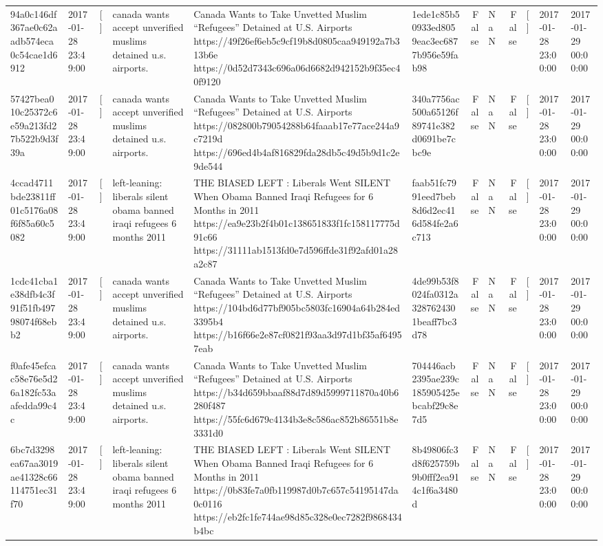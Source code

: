\begin{tabular}{llllllrlrlll}
94a0c146df367ae0c62aadb574eca0c54cae1d6912 & 2017-01-28 23:49:00 & [] & canada wants accept unverified muslims detained u.s. airports. & Canada Wants to Take Unvetted Muslim “Refugees” Detained at U.S. Airports https://49f26ef6eb5c9cf19b8d0805caa949192a7b313b6e https://0d52d7343c696a06d6682d942152b9f35ec40f9120 & 1ede1c85b50933ed8059eac3ec6877b956e59fab98 & False & NaN & False & [] & 2017-01-28 23:00:00 & 2017-01-29 00:00:00 \\
57427bea010c25372c6e59a213fd27b522b9d3f39a & 2017-01-28 23:49:00 & [] & canada wants accept unverified muslims detained u.s. airports. & Canada Wants to Take Unvetted Muslim “Refugees” Detained at U.S. Airports https://082800b79054288b64faaab17e77ace244a9c7219d https://696ed4b4af816829fda28db5c49d5b9d1c2e9de544 & 340a7756ac500a65126f89741e382d0691be7cbc9e & False & NaN & False & [] & 2017-01-28 23:00:00 & 2017-01-29 00:00:00 \\
4ccad4711bde23811ff01c5176a08f6f85a60c5082 & 2017-01-28 23:49:00 & [] & left-leaning: liberals silent obama banned iraqi refugees 6 months 2011 & THE BIASED LEFT : Liberals Went SILENT When Obama Banned Iraqi Refugees for 6 Months in 2011 https://ea9e23b2f4b01c138651833f1fc158117775d91c66 https://31111ab1513fd0e7d596ffde31f92afd01a28a2c87 & faab51fc7991eed7beb8d6d2ec416d584fe2a6c713 & False & NaN & False & [] & 2017-01-28 23:00:00 & 2017-01-29 00:00:00 \\
1cdc41cba1e38dfb4c3f91f51fb49798074f68ebb2 & 2017-01-28 23:49:00 & [] & canada wants accept unverified muslims detained u.s. airports. & Canada Wants to Take Unvetted Muslim “Refugees” Detained at U.S. Airports https://104bd6d77bf905bc5803fc16904a64b284ed3395b4 https://b16f66e2e87cf0821f93aa3d97d1bf35af64957eab & 4de99b53f8024fa0312a3287624301beaff7bc3d78 & False & NaN & False & [] & 2017-01-28 23:00:00 & 2017-01-29 00:00:00 \\
f0afe45efcac58e76e5d26a182fc53aafedda99c4c & 2017-01-28 23:49:00 & [] & canada wants accept unverified muslims detained u.s. airports. & Canada Wants to Take Unvetted Muslim “Refugees” Detained at U.S. Airports https://b34d659bbaaf88d7d89d5999711870a40b6280f487 https://55fc6d679c4134b3e8c586ac852b86551b8e3331d0 & 704446acb2395ae239c185905425ebcabf29c8e7d5 & False & NaN & False & [] & 2017-01-28 23:00:00 & 2017-01-29 00:00:00 \\
6bc7d3298ea67aa3019ae41328c66114751ec31f70 & 2017-01-28 23:49:00 & [] & left-leaning: liberals silent obama banned iraqi refugees 6 months 2011 & THE BIASED LEFT : Liberals Went SILENT When Obama Banned Iraqi Refugees for 6 Months in 2011 https://0b83fe7a0fb119987d0b7c657c54195147da0c0116 https://eb2fc1fe744ae98d85c328e0ec7282f9868434b4bc & 8b49806fc3d8f625759b9b0fff2ea914c1f6a3480d & False & NaN & False & [] & 2017-01-28 23:00:00 & 2017-01-29 00:00:00 \\

\end{tabular}
